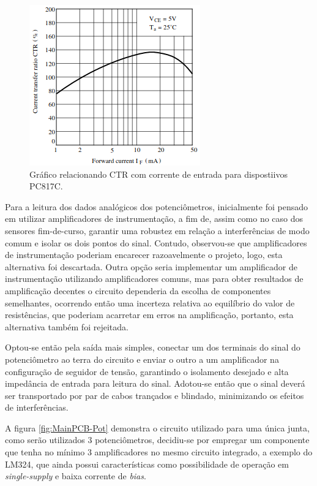 \begin{figure}[h]
    \caption{Gráfico relacionando CTR com corrente de entrada para dispostiivos PC817C.}    
    \begin{centering}

        \includegraphics[width=0.5\columnwidth]{images/pcbs/opto-CTR.png}
    
    \par\end{centering}

    \label{fig:opto-CTR}
\end{figure}

Para a leitura dos dados analógicos dos potenciômetros,
inicialmente foi pensado em utilizar amplificadores de instrumentação,
a fim de, assim como no caso dos sensores fim-de-curso, garantir uma 
robustez em relação a interferências de modo comum e isolar os dois 
pontos do sinal. Contudo, observou-se que amplificadores de 
instrumentação poderiam encarecer razoavelmente o projeto, logo, esta alternativa foi 
descartada.
Outra opção seria implementar um amplificador de instrumentação 
utilizando amplificadores comuns, mas para obter resultados de 
amplificação decentes o circuito dependeria da escolha de componentes
semelhantes, ocorrendo então uma incerteza relativa ao equilíbrio do 
valor de resistências, que poderiam acarretar em erros na amplificação, 
portanto, esta alternativa também foi rejeitada.

Optou-se então pela saída mais simples, conectar um dos terminais do 
sinal do potenciômetro ao terra do circuito e enviar o outro a um 
amplificador na configuração de seguidor de tensão, garantindo o 
isolamento desejado e alta impedância de entrada para leitura do sinal.
Adotou-se então que o sinal deverá ser transportado por par de cabos
trançados e blindado, minimizando os efeitos de interferências.

A figura \ref{fig:MainPCB-Pot} demonstra o circuito utilizado para uma 
única junta, como serão utilizados 3 potenciômetros, decidiu-se por 
empregar um componente que tenha no mínimo 3 amplificadores no mesmo 
circuito integrado, a exemplo do LM324, que ainda possui características
como possibilidade de operação em \textit{single-supply} e baixa corrente
de \textit{bias}.

